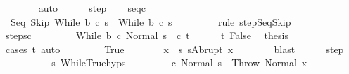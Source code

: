 \begin{isabellebody}
\ \ \ \ \ \ \isamarkupfalse%
\ auto\isanewline
\ \ \ \ \isamarkupfalse%
\ step\ \isamarkupfalse%
\ \isamarkupfalse%
\ seq{\isacharunderscore}c\ \isanewline
\ \ \ \ \isamarkupfalse%
\ \isamarkupfalse%
\ {\isachardoublequoteopen}{\isasymGamma}{\isasymturnstile}\ {\isacharparenleft}Seq\ Skip\ {\isacharparenleft}While\ b\ c{\isacharparenright}{\isacharcomma}\ s{\isacharprime}{\isacharparenright}\ {\isasymrightarrow}\ {\isacharparenleft}While\ b\ c{\isacharcomma}\ s{\isacharprime}{\isacharparenright}{\isachardoublequoteclose}\ \isanewline
\ \ \ \ \ \ \isamarkupfalse%
\ {\isacharparenleft}rule\ step{\isachardot}SeqSkip{\isacharparenright}\isanewline
\ \ \ \ \isamarkupfalse%
\ \isamarkupfalse%
\ steps{\isacharunderscore}c\isanewline
\ \ \ \ \isamarkupfalse%
\ \isamarkupfalse%
\ {\isachardoublequoteopen}{\isasymGamma}{\isasymturnstile}\ {\isacharparenleft}While\ b\ c{\isacharcomma}\ Normal\ s{\isacharparenright}\ {\isasymrightarrow}\isactrlsup {\isacharasterisk}\ {\isacharparenleft}c{\isacharprime}{\isacharcomma}\ t{\isacharprime}{\isacharparenright}{\isachardoublequoteclose}\isacommand{{\isachardot}}\isamarkupfalse%
\isanewline
\ \ \ \ \isamarkupfalse%
\ t\ False\ \isamarkupfalse%
\ {\isacharquery}thesis\isanewline
\ \ \ \ \ \ \isamarkupfalse%
\ {\isacharparenleft}cases\ t{\isacharparenright}\ auto\isanewline
\ \ \isamarkupfalse%
\isanewline
\ \ \ \ \isamarkupfalse%
\ True\isanewline
\ \ \ \ \isamarkupfalse%
\ \isamarkupfalse%
\ x\ \ s{\isacharprime}{\isacharcolon}\ {\isachardoublequoteopen}s{\isacharprime}{\isacharequal}Abrupt\ x{\isachardoublequoteclose}\isanewline
\ \ \ \ \ \ \isamarkupfalse%
\ blast\isanewline
\ \ \ \ \isamarkupfalse%
\ step\isanewline
\ \ \ \ \isamarkupfalse%
\isanewline
\ \ \ \ \isamarkupfalse%
\ s{\isacharprime}\ WhileTrue{\isachardot}hyps\ {\isacharparenleft}{}{\isacharparenright}\ \isanewline
\ \ \ \ \isamarkupfalse%
\ {\isachardoublequoteopen}{\isasymGamma}{\isasymturnstile}\ {\isacharparenleft}c{\isacharcomma}\ Normal\ s{\isacharparenright}\ {\isasymrightarrow}\isactrlsup {\isacharasterisk}\ {\isacharparenleft}Throw{\isacharcomma}\ Normal\ x{\isacharparenright}{\isachardoublequoteclose}\isanewline

\end{isabellebody}
